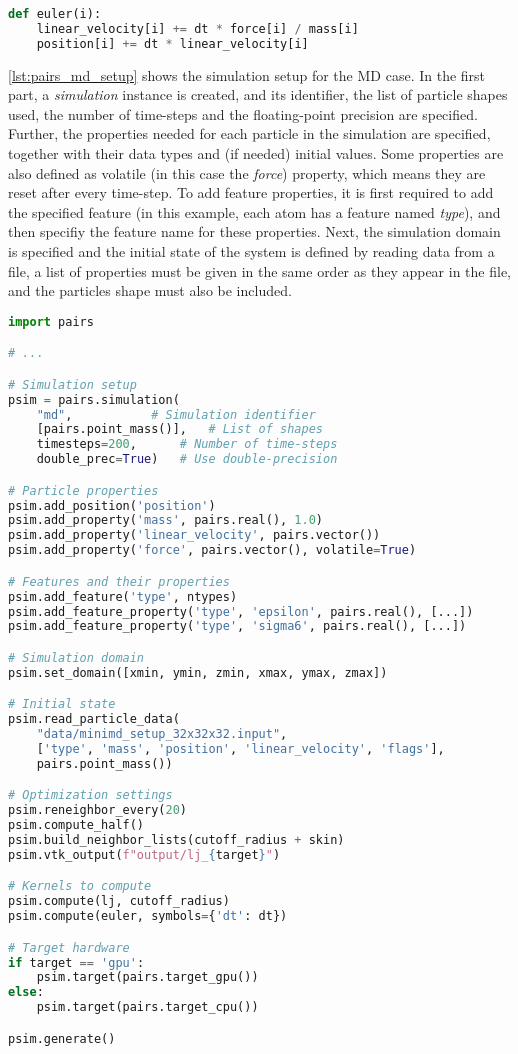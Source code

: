 \documentclass[preprint,12pt]{elsarticle}
\begin{document}
\begin{lstlisting}[language=Python,
		   label={lst:euler},
		   caption={Euler integrator description in P4IRS.}]
def euler(i):
    linear_velocity[i] += dt * force[i] / mass[i]
    position[i] += dt * linear_velocity[i]
\end{lstlisting}

\autoref{lst:pairs_md_setup} shows the simulation setup for the \ac{MD} case. In the first part, a \emph{simulation} instance is created, and its identifier, the list of particle shapes used, the number of time-steps and the floating-point precision are specified.
Further, the properties needed for each particle in the simulation are specified, together with their data types and (if needed) initial values.
Some properties are also defined as volatile (in this case the \emph{force}) property, which means they are reset after every time-step.
To add feature properties, it is first required to add the specified feature (in this example, each atom has a feature named \emph{type}), and then specifiy the feature name for these properties.
Next, the simulation domain is specified and the initial state of the system is defined by reading data from a file, a list of properties must be given in the same order as they appear in the file, and the particles shape must also be included.

\begin{lstlisting}[language=Python,
		   label={lst:pairs_md_setup},
		   caption={Simple example for MD simulation setup in P4IRS.}]
import pairs

# ...

# Simulation setup
psim = pairs.simulation(
	"md", 			# Simulation identifier
	[pairs.point_mass()], 	# List of shapes
	timesteps=200,		# Number of time-steps
	double_prec=True)	# Use double-precision

# Particle properties
psim.add_position('position')
psim.add_property('mass', pairs.real(), 1.0)
psim.add_property('linear_velocity', pairs.vector())
psim.add_property('force', pairs.vector(), volatile=True)

# Features and their properties
psim.add_feature('type', ntypes)
psim.add_feature_property('type', 'epsilon', pairs.real(), [...])
psim.add_feature_property('type', 'sigma6', pairs.real(), [...])

# Simulation domain
psim.set_domain([xmin, ymin, zmin, xmax, ymax, zmax])

# Initial state
psim.read_particle_data(
	"data/minimd_setup_32x32x32.input",
	['type', 'mass', 'position', 'linear_velocity', 'flags'],
	pairs.point_mass())

# Optimization settings
psim.reneighbor_every(20)
psim.compute_half()
psim.build_neighbor_lists(cutoff_radius + skin)
psim.vtk_output(f"output/lj_{target}")

# Kernels to compute
psim.compute(lj, cutoff_radius)
psim.compute(euler, symbols={'dt': dt})

# Target hardware
if target == 'gpu':
    psim.target(pairs.target_gpu())
else:
    psim.target(pairs.target_cpu())

psim.generate()
\end{lstlisting}
\end{document}
